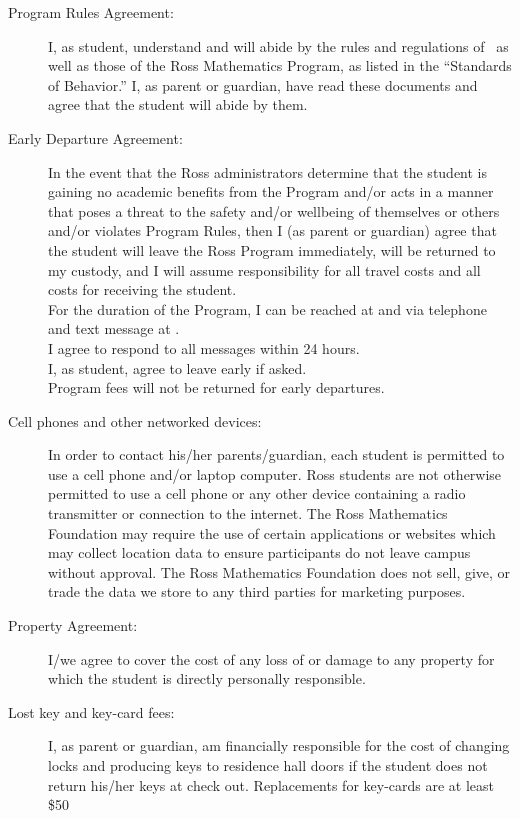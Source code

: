 \documentclass{ross}
\begin{document}
\begin{description}
\item[Program Rules Agreement:] I, as student, understand and will
  abide by the rules and regulations of \campus\ as
  well as those of the Ross Mathematics Program, as listed in the
  ``Standards of Behavior.'' I, as parent or guardian, have read
  these documents and agree that the student will abide by them.
\item[Early Departure Agreement:] In the event that the Ross
  administrators determine that the student is gaining no academic
  benefits from the Program and/or acts in a manner that poses a
  threat to the safety and/or wellbeing of themselves or others and/or
  violates Program Rules, then I (as parent or guardian) agree that
  the student will leave the Ross Program immediately, will be
  returned to my custody, and I will assume responsibility for all
  travel costs and all costs for receiving the student. \\
   For the
  duration of the Program, I can be reached at
   and via telephone and text message at
  . \\[5pt]
   I agree to respond to all messages within 24 hours. \\[1ex]
  I, as student, agree to leave early if asked.  \\
Program fees will not
  be returned for early departures.
\item[Cell phones and other networked devices:] In order to contact
his/her parents/guardian, each student is permitted to use a cell
phone and/or laptop computer. Ross students are not otherwise
permitted to use a cell phone or any other device containing a radio
transmitter or connection to the internet.  The Ross Mathematics
Foundation may require the use of certain applications or websites
which may collect location data to ensure participants do not leave
campus without approval.  The Ross Mathematics Foundation does not
sell, give, or trade the data we store to any third parties for
marketing purposes.
\item[Property Agreement:] I/we agree to cover the cost of any loss of
  or damage to any property for which the student is directly
  personally responsible.
\item[Lost key and key-card fees:] I, as parent or guardian, am
financially responsible for the cost of changing locks and producing
keys to residence hall doors if the student does not return his/her
keys at check out.  Replacements for key-cards are at least \$50

\end{description}
\end{document}
